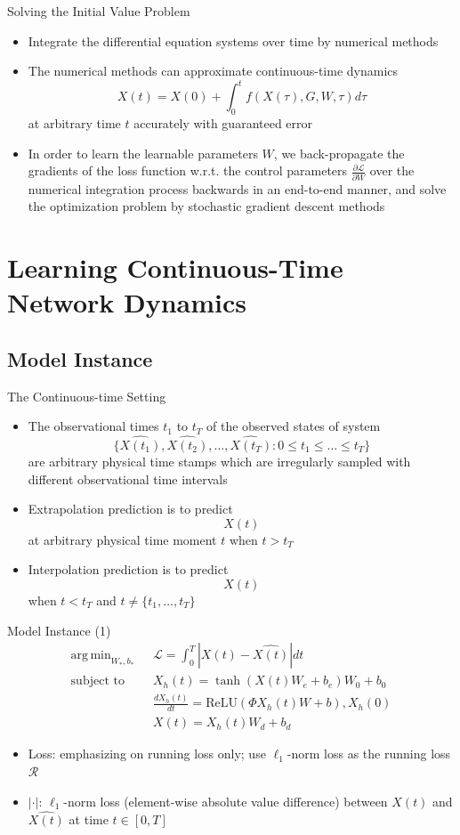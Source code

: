 \documentclass{beamer}
\DeclareMathOperator*{\argmin}{arg\,min}
\begin{document}
\begin{frame}{Solving the Initial Value Problem}
\begin{itemize}
\item Integrate the differential equation systems over time by numerical methods
\item The numerical methods can approximate continuous-time dynamics\[
X(t)=X(0)+\int_0^tf(X(\tau),G,W,\tau)d\tau
\]at arbitrary time $t$ accurately with guaranteed error
\item In order to learn the learnable parameters $W$, we back-propagate the gradients of the loss function w.r.t. the control parameters $\frac{\partial\mathcal{L}}{\partial W}$ over the numerical integration process backwards in an end-to-end manner, and solve the optimization problem by stochastic gradient descent methods
\end{itemize}
\end{frame}

\section{Learning Continuous-Time Network Dynamics}
\subsection{Model Instance}

\begin{frame}{The Continuous-time Setting}
\begin{itemize}
\item The observational times $t_1$ to $t_T$ of the observed states of system\[
\{\hat{X(t_1)},\hat{X(t_2)},\dots,\hat{X(t_T)}:0\leqslant t_1\leqslant\dots\leqslant t_T\}
\]are arbitrary physical time stamps which are irregularly sampled with different observational time intervals
\item Extrapolation prediction is to predict\[
X(t)
\]at arbitrary physical time moment $t$ when $t>t_T$
\item Interpolation prediction is to predict\[
X(t)
\] when $t<t_T$ and $t\ne\{t_1,\dots,t_T\}$
\end{itemize}
\end{frame}

\begin{frame}{Model Instance (1)}\[
\begin{split}
\argmin_{W_*,b_*}\text{ }&\mathcal{L}=\int_0^T|X(t)-\hat{X(t)}|dt\\
\text{subject to }&X_h(t)=\tanh(X(t)W_e+b_e)W_0+b_0\\
&\frac{dX_h(t)}{dt}=\text{ReLU}(\Phi X_h(t)W+b),X_h(0)\\
&X(t)=X_h(t)W_d+b_d
\end{split}
\]
\begin{itemize}
\item Loss: emphasizing on running loss only; use $\ell_1$-norm loss as the running loss $\mathcal R$
\item $|\cdot|$: $\ell_1$-norm loss (element-wise absolute value difference) between $X(t)$ and $\hat{X(t)}$ at time $t\in[0,T]$
\end{itemize}
\end{frame}
\end{document}
